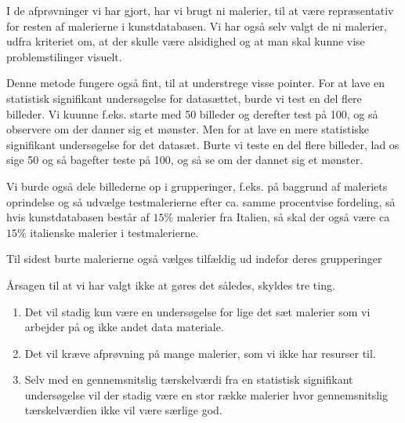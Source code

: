 I de afprøvninger vi har gjort, har vi brugt ni malerier, til at være
repræsentativ for resten af malerierne i kunstdatabasen. Vi har også selv
valgt de ni malerier, udfra kriteriet om, at der skulle være alsidighed og at
man skal kunne vise problemstilinger visuelt.

Denne metode fungere også fint, til at understrege visse pointer.
For at lave en statistisk signifikant undersøgelse for datasættet, burde
vi test en del flere billeder. Vi kuunne f.eks. starte med 50 billeder
og derefter test på 100, og så observere om der danner sig et mønster.
Men for at lave en mere statistiske signifikant undersøgelse for det
datasæt. Burte vi teste en del flere billeder, lad os sige 50 og
så bagefter teste på 100, og så se om der dannet sig et mønster. 

Vi burde også dele billederne op i grupperinger, f.eks. på baggrund af maleriets
oprindelse og så udvælge testmalerierne efter ca. samme procentvise
fordeling, så hvis kunstdatabasen består af $15 \%$ malerier fra
Italien, så skal der også være ca $15 \%$ italienske malerier i testmalerierne.

Til sidest burte malerierne også vælges tilfældig ud indefor deres
grupperinger

Årsagen til at vi har valgt ikke at gøres det således, skyldes tre ting.

\begin{enumerate}
	\item Det vil stadig kun være en undersøgelse for lige det sæt
	malerier som vi arbejder på og ikke andet data materiale.
	\item Det vil kræve afprøvning på mange malerier, som vi ikke har
	resurser til. 
	\item Selv med en gennemsnitslig tærskelværdi fra en statistisk
	signifikant undersøgelse vil der stadig være en stor række malerier
	hvor gennemsnitslig tærskelværdien ikke vil være særlige god. 
\end{enumerate}
